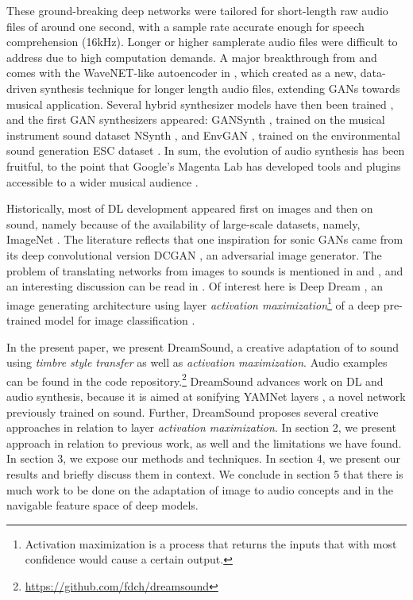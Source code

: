 \documentclass[a4paper,10pt,oneside]{article}
\begin{document}
\begin{sloppy}
These ground-breaking deep networks were tailored for short-length raw audio files of around one second, with a sample rate accurate enough for speech comprehension (16kHz). Longer or higher samplerate audio files were difficult to address due to high computation demands. A major breakthrough from \cite{oord2016wavenet} and \cite{mehri2017samplernn} comes with the WaveNET-like autoencoder in \cite{engel2017neural}, which created as a new, data-driven synthesis technique for longer length audio files, extending GANs towards musical application. Several hybrid synthesizer models have then been trained \cite{mccarthy2020hooligan}, and the first GAN synthesizers appeared: GANSynth \cite{engel2019gansynth}, trained on the musical instrument sound dataset NSynth \cite{engel2017neural}, and EnvGAN \cite{madhu2021envgan}, trained on the environmental sound generation ESC dataset \cite{2015piczak}. In sum, the evolution of audio synthesis has been fruitful, to the point that Google's Magenta Lab has developed tools and plugins accessible to a wider musical audience \cite{adam_roberts_2019_4285266}.

Historically, most of DL development appeared first on images and then on sound, namely because of the availability of large-scale datasets, namely, ImageNet \cite{ILSVRC15}. The literature reflects that one inspiration for sonic GANs came from its deep convolutional version DCGAN \cite{radford2015unsupervised}, an adversarial image generator. The problem of translating networks from images to sounds is mentioned in \cite{RothmanBlog} and \cite{2019Purwins}, and an interesting discussion can be read in \cite{Briot2017}. Of interest here is Deep Dream \cite{Mordvintsev2015}, an image generating architecture using layer \textit{activation maximization}\footnote{Activation maximization is a process that returns the inputs that with most confidence would cause a certain output.} of a deep pre-trained model for image classification \cite{szegedy2014going}. 

In the present paper, we present DreamSound, a creative adaptation of \cite{Mordvintsev2015} to sound using \textit{timbre style transfer} as well as \textit{activation maximization}. Audio examples can be found in the code repository.\footnote{\url{https://github.com/fdch/dreamsound}} DreamSound advances work on DL and audio synthesis, because it is aimed at sonifying YAMNet layers \cite{YamNet2020}, a novel network previously trained on sound. Further, DreamSound proposes several creative approaches in relation to layer \textit{activation maximization}. In section 2, we present approach in relation to previous work, as well and the limitations we have found. In section 3, we expose our methods and techniques. In section 4, we present our results and briefly discuss them in context. We conclude in section 5 that there is much work to be done on the adaptation of image to audio concepts and in the navigable feature space of deep models.


\end{sloppy}
\end{document}
